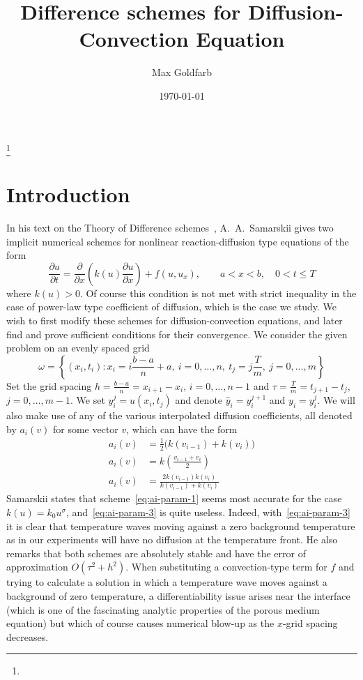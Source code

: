\documentclass[12pt, reqno]{amsart}
\newcommand{\D}[2]{\frac{\partial{} #1}{\partial{} #2}}
\newcommand{\bk}[1]{\left\{#1\right\}}
\begin{document}
\title{Difference schemes for Diffusion-Convection Equation}
\author{Max Goldfarb}
\thanks{}
\address{Mathematical Sciences Department\\Florida Institute of Technology\\150 W.\ University Blvd.\\Melbourne, FL 32901}
\date{\today}
\maketitle
\section{Introduction}
In his text on the Theory of Difference schemes~\citep{samarskii01}, A.\ A.\ Samarskii gives two implicit numerical schemes for nonlinear reaction-diffusion type equations of the form
\[ \D{u}{t}=\D{}{x}\left( k(u)\D{u}{x}\right)+f(u, u_x),\qquad a < x < b,\quad 0 < t \leq T\]
where $k(u)>0$.
Of course this condition is not met with strict inequality in the case of power-law type coefficient of diffusion, which is the case we study.
We wish to first modify these schemes for diffusion-convection equations, and later find and prove sufficient conditions for their convergence.
We consider the given problem on an evenly spaced grid
\[
  \omega=\bk{(x_{i},t_{i}):x_{i}=i \frac{b-a}{n} + a,
    ~ i=0,\ldots,n,
    ~t_{j}=j \frac{T}{m},
    ~j=0,\ldots,m}
\]
Set the grid spacing $h=\frac{b-a}{n}=x_{i+1}-x_{i}$, $i=0,\ldots,n-1$ and $\tau=\frac{T}{m}=t_{j+1}-t_{j}$, $j=0,\ldots,m-1$.
We set $y_{i}^{j}=u(x_{i},t_{j})$ and denote $\hat{y}_{i}=y_{i}^{j+1}$ and $y_{i}=y_{i}^{j}$.
We will also make use of any of the various interpolated diffusion coefficients, all denoted by $a_{i}(v)$ for some vector $v$, which can have the form
\begin{align}
  a_{i}(v) & =\frac{1}{2}\big( k(v_{i-1})+k(v_{i})\big)\label{eq:ai-param-1}
  \\
  a_{i}(v) & =k\left(\frac{v_{i-1} + v_{i}}{2}\right)\label{eq:ai-param-2}
  \\
  a_{i}(v) & =\frac{2k(v_{i-1})k(v_{i})}{k(v_{i-1})+k(v_{i})}\label{eq:ai-param-3}
\end{align}
Samarskii states that scheme~\eqref{eq:ai-param-1} seems most accurate for the case $k(u)=k_{0}u^{\sigma}$, and~\eqref{eq:ai-param-3} is quite useless.
Indeed, with~\eqref{eq:ai-param-3} it is clear that temperature waves moving against a zero background temperature as in our experiments will have no diffusion at the temperature front.
He also remarks that both schemes are absolutely stable and have the error of approximation $O(\tau^{2}+h^{2})$.
When substituting a convection-type term for $f$ and trying to calculate a solution in which a temperature wave moves against a background of zero temperature, a differentiability issue arises near the interface (which is one of the fascinating analytic properties of the porous medium equation) but which of course causes numerical blow-up as the $x$-grid spacing decreases.
\end{document}
